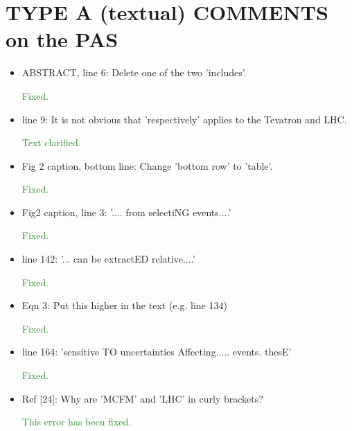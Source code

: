 \documentclass[paper=a4, fontsize=11pt]{scrartcl}
\begin{document}
\section{TYPE A (textual) COMMENTS on the PAS}
\begin{itemize}
\item ABSTRACT, line 6:	Delete one of the two 'includes'.

\textcolor{ForestGreen}{Fixed.}\\

\item line 9: It is not obvious that 'respectively' applies to the Tevatron and LHC.

\textcolor{ForestGreen}{Text clarified.}\\

 \item Fig 2 caption, bottom line: Change 'bottom row' to 'table'.

\textcolor{ForestGreen}{Fixed.}\\


\item Fig2 caption, line 3: '.... from selectiNG events....' 

\textcolor{ForestGreen}{Fixed.}\\

\item line 142: '... can be extractED relative....' 

\textcolor{ForestGreen}{Fixed.}\\

\item Eqn 3: Put this higher in the text (e.g. line 134) 

\textcolor{ForestGreen}{Fixed.}\\

\item line 164: 'sensitive TO uncertainties Affecting..... events. thesE' 

\textcolor{ForestGreen}{Fixed.}\\

\item Ref [24]: Why are 'MCFM' and 'LHC' in curly brackets?

\textcolor{ForestGreen}{This error has been fixed.}\\

\end{itemize}
\end{document}
